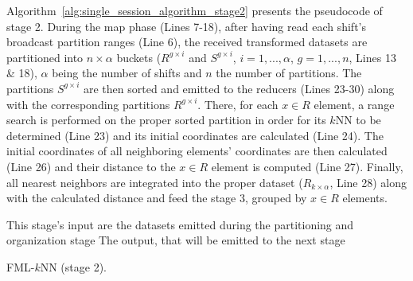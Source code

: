 Algorithm~\ref{alg:single_session_algorithm_stage2} presents the pseudocode of stage 2. During the map phase (Lines 7-18), after having read each shift's broadcast partition ranges (Line 6), the received transformed datasets are partitioned into $n \times \alpha$ buckets ($R^{g \times i}$ and $S^{g \times i}$, $i=1,...,\alpha$, $g=1,...,n$, Lines 13 \& 18), $\alpha$ being the number of shifts and $n$ the number of partitions. The partitions $S^{g \times i}$ are then sorted and emitted to the reducers (Lines 23-30) along with the corresponding partitions $R^{g \times i}$. There, for each $x \in R$ element, a range search is performed on the proper sorted partition in order for its $k$NN to be determined (Line 23) and its initial coordinates are calculated (Line 24). The initial coordinates of all neighboring elements' coordinates are then calculated (Line 26) and their distance to the $x \in R$ element is computed (Line 27). Finally, all nearest neighbors are integrated into the proper dataset ($R_{k \times \alpha}$, Line 28) along with the calculated distance and feed the stage 3, grouped by $x \in R$ elements.

\begin{algorithm}[!ht]
\begin{small}
	\DontPrintSemicolon
	\Comment This stage's input are the datasets emitted during the partitioning and organization stage \;
	\Comment The output, that will be emitted to the next stage \;
	\BlankLine
	\caption{FML-$k$NN (stage 2).}
	\label{alg:single_session_algorithm_stage2}
\end{small}
\end{algorithm}

